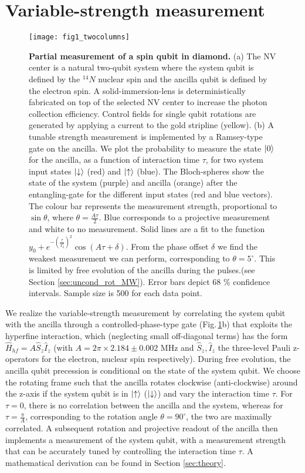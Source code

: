 \section{Variable-strength measurement}
\begin{figure*}
	\centering
	\texttt{[image: fig1\_twocolumns]}
	\caption{\label{fig:amc-fig1} \textbf{Partial measurement of a spin qubit in diamond.} (a) The NV center is a natural two-qubit system where the system qubit is defined by the $^{14}N$ nuclear spin and the ancilla qubit is defined by the electron spin. A solid-immersion-lens is deterministically fabricated on top of the selected NV center to increase the photon collection efficiency. Control fields for single qubit rotations are generated by applying a current to the gold stripline (yellow).  (b) A tunable strength measurement is implemented by a Ramsey-type gate on the ancilla. We plot the probability to measure the state $\left|0\right>$  for the ancilla, as a function of interaction time $\tau$, for two system input states $\left|\downarrow\right>$ (red) and $\left|\uparrow\right>$ (blue). The Bloch-spheres show the state of the system (purple) and ancilla (orange) after the entangling-gate for the different input states (red and blue vectors). The colour bar represents the measurement strength, proportional to $\sin{\theta}$, where $\theta=\frac{A \tau}{2}$. Blue corresponds to a projective measurement and white to no measurement. Solid lines are a  fit to the function $y_0 + e^{-( \frac{\tau}{T_2^*})^2} \cos{(A \tau + \delta)} $. From the phase offset $\delta$ we find the weakest measurement we can perform, corresponding to $\theta = 5^{\circ}$. This is limited by free evolution of the ancilla during the pulses.(see Section \ref{sec:uncond_rot_MW}). Error bars depict 68 $\%$ confidence intervals. Sample size is 500 for each data point. }
\end{figure*}

We realize the variable-strength measurement by correlating the system qubit with the ancilla through a controlled-phase-type gate (Fig.\,\ref{fig:amc-fig1}b) that exploits the hyperfine interaction, which (neglecting small off-diagonal terms) has the form $\hat{H}_{hf}=A\hat{S}_{z}\hat{I}_{z}$ (with $A = 2 \pi \times 2.184 \pm 0.002$ MHz and $\hat{S}_{z}, \hat{I}_{z}$ the three-level Pauli z-operators for the electron, nuclear spin respectively).  During free evolution, the ancilla qubit precession is conditional on the state of the system qubit. We choose the rotating frame such that the ancilla rotates clockwise (anti-clockwise) around the z-axis if the system qubit is in $\left|\uparrow\right>$ ($\left|\downarrow\right>$) and vary the interaction time $\tau$. For $\tau = 0$, there is no correlation between the ancilla and the system, whereas for $\tau = \frac{\pi}{A}$, corresponding to the rotation angle $\theta = 90^{\circ}$, the two are maximally correlated. A subsequent rotation and projective readout of the ancilla then implements a measurement of the system qubit, with a measurement strength that can be accurately tuned by controlling the interaction time $\tau$. A mathematical derivation  can be found in Section \ref{sec:theory}.

